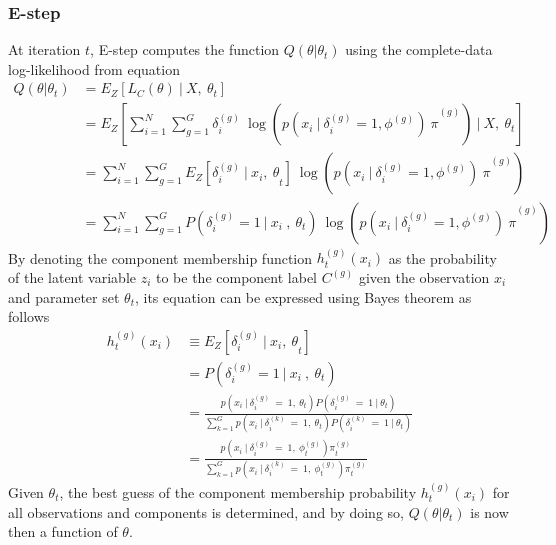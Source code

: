 \subsubsection{E-step}
\label{sec:estep}
At iteration $t$, E-step computes the function $\displaystyle Q( \theta |\theta_{t})$ using the complete-data log-likelihood from equation 
\begin{equation}
    \begin{aligned}
    Q( \theta |\theta _{t}) & =E_{Z}[ L_{C}( \theta ) \ |\ X,\ \theta _{t}]\\
     & =E_{Z}\left[{\displaystyle \sum ^{N}_{i=1}\sum ^{G}_{g=1} \delta ^{( g)}_{i} \ }\log\left({\displaystyle p\left( x_{i} \ |\ \delta ^{( g)}_{i} =1,\phi ^{( g)}\right) \ \pi }^{( g)}\right) \ |\ X,\ \theta _{t}\right]\\
     & =\sum ^{N}_{i=1}\sum ^{G}_{g=1} E_{Z}\left[{\displaystyle \delta ^{( g)}_{i} \ |\ x_{i} ,\ \theta }_{t}\right] \ \log\left({\displaystyle p\left( x_{i} \ |\ \delta ^{( g)}_{i} =1,\phi ^{( g)}\right) \ \pi }^{( g)}\right)\\
     & =\sum ^{N}_{i=1}\sum ^{G}_{g=1} P\left( \delta ^{( g)}_{i} =1\ |\ x_{i} \ ,\ \theta _{t}\right){\displaystyle \ }\log\left({\displaystyle p\left( x_{i} \ |\ \delta ^{( g)}_{i} =1,\phi ^{( g)}\right) \ \pi }^{( g)}\right)
    \end{aligned}
    \label{eq:qfunc}
\end{equation}
By denoting the component membership function $h^{( g)}_{t}( x_{i})$ as the probability of the latent variable $z_i$ to be the component label $C^{(g)}$ given the observation $x_i$ and parameter set $\theta_t$, its equation can be expressed using Bayes theorem as follows
\begin{equation}
    \begin{aligned}
    h^{( g)}_{t}( x_{i}) & \equiv E_{Z}\left[{\displaystyle \delta ^{( g)}_{i} \ |\ x_{i} ,\ \theta }_{t}\right]\\
     & =P\left( \delta ^{( g)}_{i} =1\ |\ x_{i} \ ,\ \theta _{t}\right)\\
     & =\frac{p\left( x_{i} \ |\ \delta ^{( g)}_{i} \ =\ 1,\ \theta _{t}\right) P\left( \delta ^{( g)}_{i} \ =\ 1\ |\ \theta _{t}\right)}{\sum\limits ^{G}_{k=1} p\left( x_{i} \ |\ \delta ^{( k)}_{i} \ =\ 1,\ \theta _{t}\right) P\left( \delta ^{( k)}_{i} \ =\ 1\ |\ \theta _{t}\right)}\\
     & =\frac{p\left( x_{i} \ |\ \delta ^{( g)}_{i} \ =\ 1,\ \phi ^{( g)}_{t}\right) \pi ^{( g)}_{t}}{\sum\limits ^{G}_{k=1} p\left( x_{i} \ |\ \delta ^{( k)}_{i} \ =\ 1,\ \phi ^{( g)}_{t}\right) \pi ^{( g)}_{t}}
    \end{aligned}
    \label{eq:clustermemfunc}
\end{equation}
Given $\theta_t$, the best guess of the component membership probability $h^{( g)}_{t}( x_{i})$ for all observations and components is determined, and by doing so, $\displaystyle Q( \theta |\theta _{t})$ is now then a function of $\theta$.

